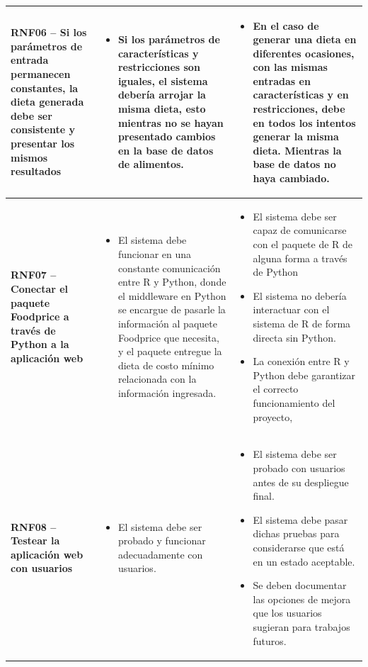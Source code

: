 \begin{longtable}[c]{| p{}  | p{}  | p{}  |}
        \textbf{RNF06 -- Si los par\'ametros de entrada permanecen constantes, la dieta generada debe ser consistente y presentar los mismos resultados} & \begin{itemize}
             \item Si los par\'ametros de caracter\'isticas y restricciones son iguales, el sistema deber\'ia arrojar la misma dieta, esto mientras no se hayan presentado cambios en la base de datos de alimentos.
         \end{itemize}& \begin{itemize}
             \item En el caso de generar una dieta en diferentes ocasiones, con las mismas entradas en caracter\'isticas y en restricciones, debe en todos los intentos generar la misma dieta. Mientras la base de datos no haya cambiado.
         \end{itemize} \\  \hline

         \textbf{RNF07 -- Conectar el paquete Foodprice a trav\'es de Python a la aplicaci\'on web} & \begin{itemize}
             \item El sistema debe funcionar en una constante comunicaci\'on entre R y Python, donde el middleware en Python se encargue de pasarle la informaci\'on al paquete Foodprice que necesita, y el paquete entregue la dieta de costo m\'inimo relacionada con la informaci\'on ingresada.
         \end{itemize}& \begin{itemize}
             \item El sistema debe ser capaz de comunicarse con el paquete de R de alguna forma a trav\'es de Python
             \item El sistema no deber\'ia interactuar con el sistema de R de forma directa sin Python.
             \item La conexi\'on entre R y Python debe garantizar el correcto funcionamiento del proyecto,
             
         \end{itemize} \\  \hline

         \textbf{RNF08 -- Testear la aplicaci\'on web con usuarios} & \begin{itemize}
             \item El sistema debe ser probado y funcionar adecuadamente con usuarios.
         \end{itemize}& \begin{itemize}
             \item El sistema debe ser probado con usuarios antes de su despliegue final.
             \item El sistema debe pasar dichas pruebas para considerarse que est\'a en un estado aceptable.
             \item Se deben documentar las opciones de mejora que los usuarios sugieran para trabajos futuros.
             

\end{itemize}
\end{longtable}
